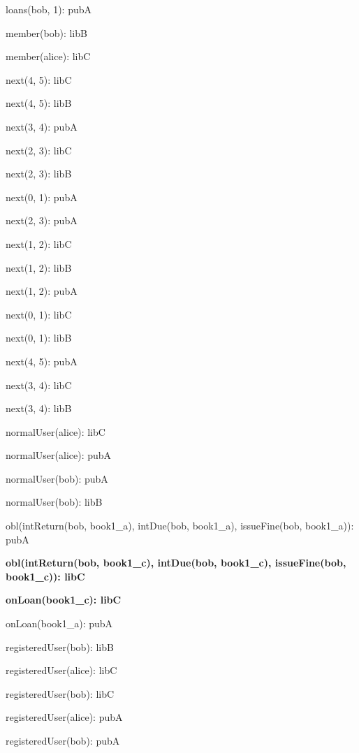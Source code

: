 \documentclass{article}
\newenvironment{states}
        {\begin{minipage}{\tableWidth}\raggedright\begin{description}[align=left,leftmargin=1em,noitemsep,labelsep=\parindent]}
        {\end{description}\end{minipage}}
\begin{document}
{\begin{states}
\item{{loans(\allowbreak{}bob, 1): pubA}}
\item{{member(\allowbreak{}bob): libB}}
\item{{member(\allowbreak{}alice): libC}}
\item{{next(\allowbreak{}4, 5): libC}}
\item{{next(\allowbreak{}4, 5): libB}}
\item{{next(\allowbreak{}3, 4): pubA}}
\item{{next(\allowbreak{}2, 3): libC}}
\item{{next(\allowbreak{}2, 3): libB}}
\item{{next(\allowbreak{}0, 1): pubA}}
\item{{next(\allowbreak{}2, 3): pubA}}
\item{{next(\allowbreak{}1, 2): libC}}
\item{{next(\allowbreak{}1, 2): libB}}
\item{{next(\allowbreak{}1, 2): pubA}}
\item{{next(\allowbreak{}0, 1): libC}}
\item{{next(\allowbreak{}0, 1): libB}}
\item{{next(\allowbreak{}4, 5): pubA}}
\item{{next(\allowbreak{}3, 4): libC}}
\item{{next(\allowbreak{}3, 4): libB}}
\item{{normalUser(\allowbreak{}alice): libC}}
\item{{normalUser(\allowbreak{}alice): pubA}}
\item{{normalUser(\allowbreak{}bob): pubA}}
\item{{normalUser(\allowbreak{}bob): libB}}
\item{{obl(\allowbreak{}intReturn(\allowbreak{}bob, book1\_a), intDue(\allowbreak{}bob, book1\_a), issueFine(\allowbreak{}bob, book1\_a)): pubA}}
\item\textbf{{obl(\allowbreak{}intReturn(\allowbreak{}bob, book1\_c), intDue(\allowbreak{}bob, book1\_c), issueFine(\allowbreak{}bob, book1\_c)): libC}}
\item\textbf{{onLoan(\allowbreak{}book1\_c): libC}}
\item{{onLoan(\allowbreak{}book1\_a): pubA}}
\item{{registeredUser(\allowbreak{}bob): libB}}
\item{{registeredUser(\allowbreak{}alice): libC}}
\item{{registeredUser(\allowbreak{}bob): libC}}
\item{{registeredUser(\allowbreak{}alice): pubA}}
\item{{registeredUser(\allowbreak{}bob): pubA}}
\end{states}}
\end{document}
